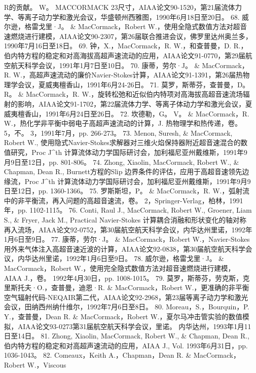 \documentclass[UTF8,11pt,a4paper,openany,fontset=fandol]{ctexbook}
\begin{document}
R的贡献。 W。 MACCORMACK 23尺寸，AIAA论文90-1520，第21届流体力学、等离子动力学和激光会议，华盛顿州西雅图，1990年6月18日至20日。 68. 威尔逊，格雷戈里·J。 \& MacCormack，Robert W.，使用全隐式数值方法对超音速燃烧进行建模，AIAA论文90-2307，第26届联合推进会议，佛罗里达州奥兰多，1990年7月16日至18日。 69. 钟，X.，MacCormack，R. W.，和查普曼，D. R.，伯内特方程的稳定和对高海拔高超声速流动的应用，AIAA论文91-0770，第29届航空航天科学会议，1991年1月7日至10日。 70. 康蒂，劳尔·J。 \& MacCormack，R. W.，高超声速流动的廉价Navier-Stokes计算，AIAA论文91-1391，第26届热物理学会议，夏威夷檀香山，1991年6月24-26日。 71. 莫罗，斯蒂芬，查普曼，D。 R。 \& MacCormack，R. W.，旋转松弛和近似伯内特项对高海拔高超音速流场辐射的影响，AIAA论文91-1702，第22届流体力学、等离子体动力学和激光会议，夏威夷檀香山，1991年6月24日至26日。 72. 坎德勒，G。 V。 \& MacCormack，R. W.，热化学非平衡中弱电子高超声速流动的计算，J. 热物理学和热传递，卷。 5，不。 3，1991年7月，pp. 266-273。 73. Menon, Suresh, \& MacCormack, Robert W., 使用隐式Navier-Stokes求解器对三维火焰保持器附近超音速混合的数值研究，Proc J\textasciicircum{}th 计算流体动力学国际研讨会，加利福尼亚州戴维斯，1991年9月9日至12日，pp. 801-806。 74. Zhong, Xiaolin, MacCormack, Robert W., \& Chapman, Dean R., Burnett方程的Slip 边界条件的评估，应用于高超音速领先边缘流，Proc J\textasciicircum{}th 计算流体动力学国际研讨会，加利福尼亚州戴维斯，1991年9月9日至12日，pp. 1360-1366。 75. 罗斯斯坦，P。 \& MacCormack，R. W.，弧射流中的非平衡流，再入问题的高超音速流，卷。 2，Springer-Verlag，柏林，1991年，pp. 1102-1115。 76. Conti, Raul J., MacCormack, Robert W., Groener, Liam S., \& Fryer, Jack M., Practical Navier-Stokes 计算耦合消融和形状变化的轴对称再入流场，AIAA论文92-0752，第30届航空航天科学会议，内华达州里诺，1992年1月6日至9日。 77. 康蒂，劳尔·J。 \& MacCormack，Robert W.，Navier-Stokes用外来气体注入高超音速近波的计算，AIAA论文92-0838，第30届航空航天科学会议，内华达州里诺，1992年1月6日至9日。 78. 威尔逊，格雷戈里·J。 \& MacCormack，Robert W.，使用完全隐式数值方法对超音速燃烧进行建模，AIAA J.，卷。 1992年4月30日，pp. 1008-1015。 79. 莫罗，斯蒂芬，劳克斯，克里斯托夫·O.，查普曼，迪恩·R. \& MacCormack，Robert W.，更准确的非平衡空气辐射代码-NEQAIR第二代，AIAA论文92-2968，第23届等离子动力学和激光会议，田纳西州纳什维尔，1992年7月6日至8日。 80. Moreau，S.，Bourquin，P. Y.，查普曼，Dean R. \& MacCormack，Robert W.，夏尔马冲击管实验的数值模拟，AIAA论文93-0273第31届航空航天科学会议，里诺。 内华达州，1993年1月11日至14日。 81. Zhong, Xiaolin, MacCormack, Robert W., \& Chapman, Dean R., 伯内特方程的稳定和对高超声速流动的应用，AIAA J., Vol. 1993年6月31日，pp. 1036-1043。 82. Comeaux，Keith A.，Chapman，Dean R. \& MacCormack，Robert W.，Viscous
\end{document}

